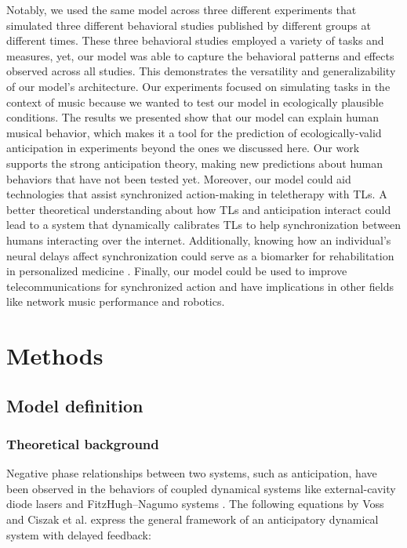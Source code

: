 \documentclass{report}
\begin{document}
Notably, we used the same model across three different experiments that simulated three different behavioral studies published by different groups at different times. These three behavioral studies employed a variety of tasks and measures, yet, our model was able to capture the behavioral patterns and effects observed across all studies. This demonstrates the versatility and generalizability of our model's architecture. Our experiments focused on simulating tasks in the context of music because we wanted to test our model in ecologically plausible conditions. The results we presented show that our model can explain human musical behavior, which makes it a tool for the prediction of ecologically-valid anticipation in experiments beyond the ones we discussed here. Our work supports the strong anticipation theory, making new predictions about human behaviors that have not been tested yet. Moreover, our model could aid technologies that assist synchronized action-making in teletherapy with TLs. A better theoretical understanding about how TLs and anticipation interact could lead to a system that dynamically calibrates TLs to help synchronization between humans interacting over the internet. Additionally, knowing how an individual's neural delays affect synchronization could serve as a biomarker for rehabilitation in personalized medicine \cite{slowinski2016dynamic, slowinski2017unravelling}. Finally, our model could be used to improve telecommunications for synchronized action and have implications in other fields like network music performance and robotics.

\section{Methods}

\subsection{Model definition}

\subsubsection{Theoretical background}

Negative phase relationships between two systems, such as anticipation, have been observed in the behaviors of coupled dynamical systems like external-cavity diode lasers \cite{ikeda1980optical} and FitzHugh–Nagumo systems \cite{toral2003characterization}. The following equations by Voss \cite{voss2000anticipating, boccaletti2001space} and Ciszak et al. \cite{ciszak2004dynamical} express the general framework of an anticipatory dynamical system with delayed feedback: 
\end{document}
